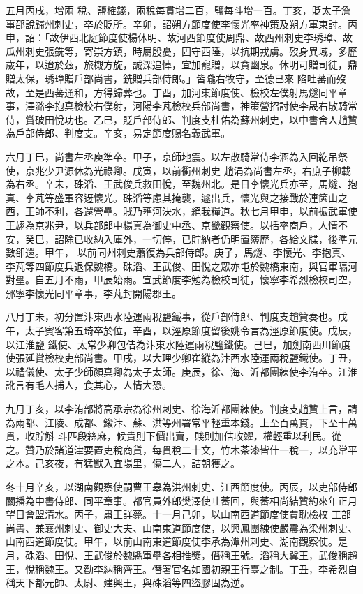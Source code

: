 \begin{pinyinscope}
 五月丙戌，增兩
 稅、鹽榷錢，兩稅每貫增二百，鹽每斗增一百。丁亥，貶太子詹事邵說歸州刺史，卒於貶所。辛卯，詔朔方節度使李懷光率神策及朔方軍東討。丙申，詔：「故伊西北庭節度使楊休明、故河西節度使周鼎、故西州刺史李琇璋、故瓜州刺史張銑等，寄崇方鎮，時屬殷憂，固守西陲，以抗期戎虜。歿身異域，多歷歲年，以迨於茲，旅櫬方旋，誠深追悼，宜加寵贈，以賁幽泉。休明可贈司徒，鼎贈太保，琇璋贈戶部尚書，銑贈兵部侍郎。」皆隴右牧守，至德已來
 陷吐蕃而歿故，至是西蕃通和，方得歸葬也。丁酉，加河東節度使、檢校左僕射馬燧同平章事，澤潞李抱真檢校右僕射，河陽李芃檢校兵部尚書，神策營招討使李晟右散騎常侍，賞破田悅功也。乙巳，貶戶部侍郎、判度支杜佑為蘇州刺史，以中書舍人趙贊為戶部侍郎、判度支。辛亥，易定節度賜名義武軍。



 六月丁巳，尚書左丞庾準卒。甲子，京師地震。以左散騎常侍李涵為入回紇吊祭使，京兆少尹源休為光祿卿。戊寅，以前衢州刺史
 趙涓為尚書左丞，右庶子柳載為右丞。辛未，硃滔、王武俊兵救田悅，至魏州北。是日李懷光兵亦至，馬燧、抱真、李芃等盛軍容迓懷光。硃滔等慮其掩襲，遽出兵，懷光與之接戰於連篋山之西，王師不利，各還營壘。賊乃壅河決水，絕我糧道。秋七月甲申，以前振武軍使王翃為京兆尹，以兵部郎中楊真為御史中丞、京畿觀察使。以括率商戶，人情不安，癸巳，詔除已收納入庫外，一切停，已貯納者仍明置簿歷，各給文牒，後準元數卻還。甲午，
 以前同州刺史蕭復為兵部侍郎。庚子，馬燧、李懷光、李抱真、李芃等四節度兵退保魏橋。硃滔、王武俊、田悅之眾亦屯於魏橋東南，與官軍隔河對壘。自五月不雨，甲辰始雨。宣武節度李勉為檢校司徒，懷寧李希烈檢校司空，邠寧李懷光同平章事，李芃封開陽郡王。



 八月丁未，初分置汴東西水陸運兩稅鹽鐵事，從戶部侍郎、判度支趙贊奏也。戊午，太子賓客第五琦卒於位，辛酉，以涇原節度留後姚令言為涇原節度使。戊辰，以江淮鹽
 鐵使、太常少卿包佶為汴東水陸運兩稅鹽鐵使。己巳，加劍南西川節度使張延賞檢校吏部尚書。甲戌，以大理少卿崔縱為汴西水陸運兩稅鹽鐵使。丁丑，以禮儀使、太子少師顏真卿為太子太師。庚辰，徐、海、沂都團練使李洧卒。江淮訛言有毛人捕人，食其心，人情大恐。



 九月丁亥，以李洧部將高承宗為徐州刺史、徐海沂都團練使。判度支趙贊上言，請為兩都、江陵、成都、鎩汴、蘇、洪等州署常平輕重本錢。上至百萬貫，下至十萬貫，收貯斛
 斗匹段絲麻，候貴則下價出賣，賤則加估收糴，權輕重以利民。從之。贊乃於諸道津要置吏稅商貨，每貫稅二十文，竹木茶漆皆什一稅一，以充常平之本。己亥夜，有猛獸入宜陽里，傷二人，詰朝獲之。



 冬十月辛亥，以湖南觀察使嗣曹王皋為洪州刺史、江西節度使。丙辰，以吏部侍郎關播為中書侍郎、同平章事。都官員外郎樊澤使吐蕃回，與蕃相尚結贊約來年正月望日會盟清水。丙子，肅王詳薨。十一月己卯，以山南西道節度使賈耽檢校
 工部尚書、兼襄州刺史、御史大夫、山南東道節度使，以興鳳團練使嚴震為梁州刺史、山南西道節度使。甲午，以前山南東道節度使李承為潭州刺史、湖南觀察使。是月，硃滔、田悅、王武俊於魏縣軍壘各相推獎，僭稱王號。滔稱大冀王，武俊稱趙王，悅稱魏王。又勸李納稱齊王。僭署官名如國初親王行臺之制。丁丑，李希烈自稱天下都元帥、太尉、建興王，與硃滔等四盜膠固為逆。




\end{pinyinscope}
